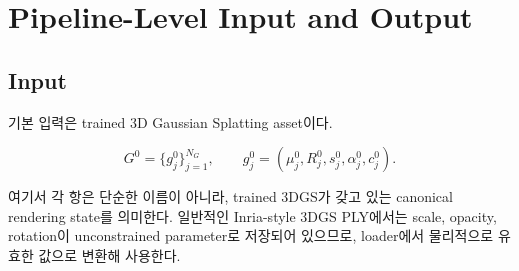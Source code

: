 \documentclass[11pt,a4paper]{article}
\begin{document}
\section{Pipeline-Level Input and Output}

\subsection{Input}

기본 입력은 trained 3D Gaussian Splatting asset이다.

\begin{equation}
G^0 = \{g_j^0\}_{j=1}^{N_G},\qquad
 g_j^0=(\mu_j^0,R_j^0,s_j^0,\alpha_j^0,c_j^0).
\end{equation}

여기서 각 항은 단순한 이름이 아니라, trained 3DGS가 갖고 있는 canonical rendering state를 의미한다.
일반적인 Inria-style 3DGS PLY에서는 scale, opacity, rotation이 unconstrained parameter로 저장되어 있으므로, loader에서 물리적으로 유효한 값으로 변환해 사용한다.
\end{document}
